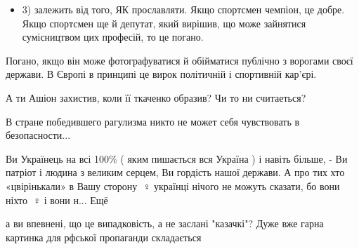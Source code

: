\begin{itemize}
\begin{itemize}
\item 3) залежить від того, ЯК прославляти. Якщо спортсмен чемпіон, це добре. Якщо
спортсмен ще й депутат, який вирішив, що може зайнятися сумісництвом цих
професій, то це погано.
\end{itemize}

Погано, якщо він може фотографуватися й обійматися публічно з ворогами своєї
держави. В Європі в принципі це вирок політичній і спортивній кар'єрі.


 

А ти Ашіон захистив, коли її ткаченко образив? Чи то ни считаеться?


 
В стране победившего рагулизма никто не может себя чувствовать в безопасности...

 

Ви Українець на всі 100\% ( яким пишається вся Україна ) і навіть більше, - Ви
патріот і людина з великим серцем, Ви гордість нашої держави. А про тих хто
«цвірінькали» в Вашу сторону 🤦♀️ українці нічого не можуть сказати, бо
вони ніхто 🤷♀️ і вони н... Ещё


 

а ви впевнені, що це випадковість, а не заслані "казачкі"? Дуже вже гарна картинка для рфської пропаганди складається


 

\end{itemize}
